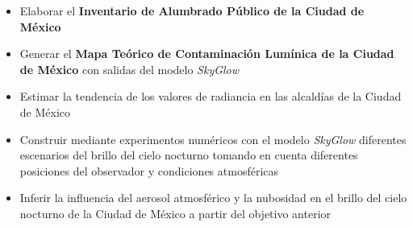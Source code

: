 \begin{itemize}

    \item Elaborar el \textbf{Inventario de Alumbrado Público de la Ciudad de México}
    
    \item Generar el \textbf{Mapa Teórico de Contaminación Lumínica de la Ciudad de México} con salidas del modelo \textit{SkyGlow} 
    
    \item Estimar la tendencia de los valores de radiancia en las alcaldías de la Ciudad de México
    
    \item Construir mediante experimentos numéricos con el modelo \textit{SkyGlow} diferentes escenarios del brillo del cielo nocturno tomando en cuenta diferentes posiciones del observador y condiciones atmosféricas
    
    \item Inferir la influencia del aerosol atmosférico  y la nubosidad en el brillo del cielo nocturno de la Ciudad de México a partir del objetivo anterior
    
    
\end{itemize}